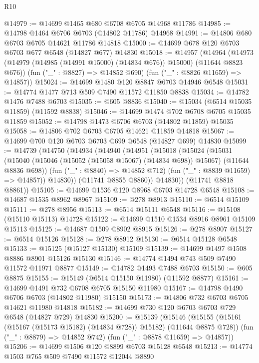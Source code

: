 \begin{lexlean}{R10}
\begin{coremodule}
@14979 := @14699 @1465 @680 @6708 @6705 @14968 @11786
@14985 := @14798 @1464 @6706 @6703 (@14802 @11786) @14968
@14991 := @14806 @680 @6703 @6705 @14621 @11786 @14818
@15000 := @14699 @678 @120 @6703 @6703 @677 @6548 (@14827 @677) @14830
@15018 := @14957
    (@14964
      (@14973 (@14979 (@14985 (@14991 @15000) (@14834 @676)) @15000) (@11644 @8823 @676))
      (fun ("_" : @8827) => @14852 @690)
      (fun ("_" : @8826 @11659) => @14857))
@15024 := @14699 @1480 @120 @8847 @6703 @14946 @6548
@15031 := @14774 @1477 @713 @509 @7490 @11572 @11850 @8838
@15034 := @14782 @1476 @7488 @6703
@15035 := @605 @8836
@15040 := @15034 (@6514 @15035 @11859) (@11592 @8838)
@15046 := @14699 @1474 @702 @6708 @6705 @15035 @11859
@15052 := @14798 @1473 @6706 @6703 (@14802 @11859) @15035
@15058 := @14806 @702 @6703 @6705 @14621 @11859 @14818
@15067 := @14699 @700 @120 @6703 @6703 @699 @6548 (@14827 @699) @14830
@15099 := @14739
    (@14750
      (@14934
        (@14940
          (@14951
            (@15018
              (@15024
                (@15031
                  (@15040
                    (@15046 (@15052 (@15058 @15067) (@14834 @698)) @15067)
                    (@11644 @8836 @698))
                  (fun ("_" : @8840) => @14852 @712)
                  (fun ("_" : @8839 @11659) => @14857))
                @14830))
            (@11741 @8855 @8860))
          @14830))
      (@11741 @8818 @8861))
@15105 := @14699 @1536 @120 @8968 @6703 @14728 @6548
@15108 := @14687 @1535 @8962 @8967
@15109 := @278 @8913
@15110 := @6514 @15109
@15111 := @278 @8956
@15113 := @6514 @15111 @6548
@15116 := @15108 (@15110 @15113) @14728
@15122 := @14699 @1510 @1534 @8916 @8961 @15109 @15113
@15125 := @14687 @1509 @8902 @8915
@15126 := @278 @8907
@15127 := @6514 @15126
@15128 := @278 @8912
@15130 := @6514 @15128 @6548
@15133 := @15125 (@15127 @15130) @15109
@15139 := @14699 @1497 @1508 @8886 @8901 @15126 @15130
@15146 := @14774 @1494 @743 @509 @7490 @11572 @11971 @8877
@15149 := @14782 @1493 @7488 @6703
@15150 := @605 @8875
@15155 := @15149 (@6514 @15150 @11980) (@11592 @8877)
@15161 := @14699 @1491 @732 @6708 @6705 @15150 @11980
@15167 := @14798 @1490 @6706 @6703 (@14802 @11980) @15150
@15173 := @14806 @732 @6703 @6705 @14621 @11980 @14818
@15182 := @14699 @730 @120 @6703 @6703 @729 @6548 (@14827 @729) @14830
@15200 := @15139
    (@15146
      (@15155 (@15161 (@15167 (@15173 @15182) (@14834 @728)) @15182) (@11644 @8875 @728))
      (fun ("_" : @8879) => @14852 @742)
      (fun ("_" : @8878 @11659) => @14857))
@15206 := @14699 @1506 @120 @8899 @6703 @15128 @6548
@15213 := @14774 @1503 @765 @509 @7490 @11572 @12044 @8890

\end{coremodule}
\end{lexlean}
